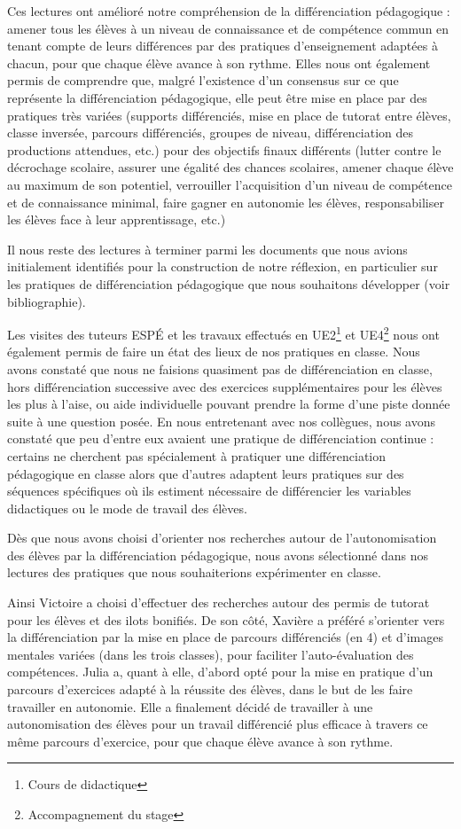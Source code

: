 Ces lectures ont amélioré notre compréhension de la différenciation pédagogique : amener tous les élèves à un niveau de connaissance et de compétence commun en tenant compte de leurs différences par des pratiques d’enseignement adaptées à chacun, pour que chaque élève avance à son rythme. Elles nous ont également permis de comprendre que, malgré l'existence d'un consensus sur ce que représente la différenciation pédagogique, elle peut être mise en place par des pratiques très variées (supports différenciés, mise en place de tutorat entre élèves, classe inversée, parcours différenciés, groupes de niveau, différenciation des productions attendues, etc.) pour des objectifs finaux différents (lutter contre le décrochage scolaire, assurer une égalité des chances scolaires, amener chaque élève au maximum de son potentiel, verrouiller l’acquisition d’un niveau de compétence et de connaissance minimal, faire gagner en autonomie les élèves, responsabiliser les élèves face à leur apprentissage, etc.)

Il nous reste des lectures à terminer parmi les documents que nous avions initialement identifiés pour la construction de notre réflexion, en particulier sur les pratiques de différenciation pédagogique que nous souhaitons développer (voir bibliographie).

Les visites des tuteurs ESPÉ et les travaux effectués en UE2\footnote{Cours de didactique} et UE4\footnote{Accompagnement du stage} nous ont également permis de faire un état des lieux de nos pratiques en classe. Nous avons constaté que nous ne faisions quasiment pas de différenciation en classe, hors différenciation successive avec des exercices supplémentaires pour les élèves les plus à l’aise, ou aide individuelle pouvant prendre la forme d’une piste donnée suite à une question posée.
En nous entretenant avec nos collègues, nous avons constaté que peu d’entre eux avaient une pratique de différenciation continue : certains ne cherchent pas spécialement à pratiquer une différenciation pédagogique en classe alors que d’autres adaptent leurs pratiques sur des séquences spécifiques où ils estiment nécessaire de différencier les variables didactiques ou le mode de travail des élèves.

Dès que nous avons choisi d’orienter nos recherches autour de l’autonomisation des élèves par la différenciation pédagogique, nous avons sélectionné dans nos lectures des pratiques que nous souhaiterions expérimenter en classe.

Ainsi Victoire a choisi d’effectuer des recherches autour des permis de tutorat pour les élèves et des ilots bonifiés. De son côté, Xavière a préféré s’orienter vers la différenciation par la mise en place de parcours différenciés (en 4) et d’images mentales variées (dans les trois classes), pour faciliter l’auto-évaluation des compétences. Julia a, quant à elle, d’abord opté pour la mise en pratique d’un parcours d’exercices adapté à la réussite des élèves, dans le but de les faire travailler en autonomie. Elle a finalement décidé de travailler à une autonomisation des élèves pour un travail différencié plus efficace à travers ce même parcours d’exercice, pour que chaque élève avance à son rythme.

